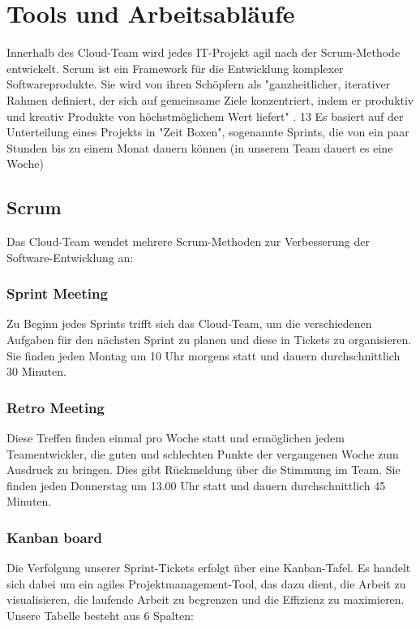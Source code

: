 \section{Tools und Arbeitsabläufe}

Innerhalb des Cloud-Team wird jedes IT-Projekt agil nach der Scrum-Methode entwickelt.
Scrum ist ein Framework für die Entwicklung komplexer Softwareprodukte.
Sie wird von ihren Schöpfern als "ganzheitlicher, iterativer Rahmen definiert, der sich auf gemeinsame Ziele konzentriert, indem er produktiv und kreativ Produkte von höchstmöglichem Wert liefert" \cite{ScrumGuide}.
13
Es basiert auf der Unterteilung eines Projekts in "Zeit Boxen", sogenannte Sprints, die von ein paar Stunden bis zu einem Monat dauern können (in unserem Team dauert es eine Woche)

\subsection{Scrum}

Das Cloud-Team wendet mehrere Scrum-Methoden zur Verbesserung der
Software-Entwicklung an:

\subsubsection{Sprint Meeting}
Zu Beginn jedes Sprints trifft sich das Cloud-Team, um die verschiedenen Aufgaben für den nächsten Sprint zu planen und diese in Tickets zu organisieren.
Sie finden jeden Montag um 10 Uhr morgens statt und dauern durchschnittlich 30 Minuten.

\subsubsection{Retro Meeting}
Diese Treffen finden einmal pro Woche statt und ermöglichen jedem Teamentwickler, die guten und schlechten Punkte der vergangenen Woche zum Ausdruck zu bringen.
Dies gibt Rückmeldung über die Stimmung im Team. Sie finden jeden Donnerstag um 13.00 Uhr statt und dauern durchschnittlich 45 Minuten.

\subsubsection{Kanban board}
Die Verfolgung unserer Sprint-Tickets erfolgt über eine Kanban-Tafel.
Es handelt sich dabei um ein agiles Projektmanagement-Tool, das dazu dient, die Arbeit zu visualisieren, die laufende Arbeit zu begrenzen und die Effizienz zu maximieren.
Unsere Tabelle besteht aus 6 Spalten:


